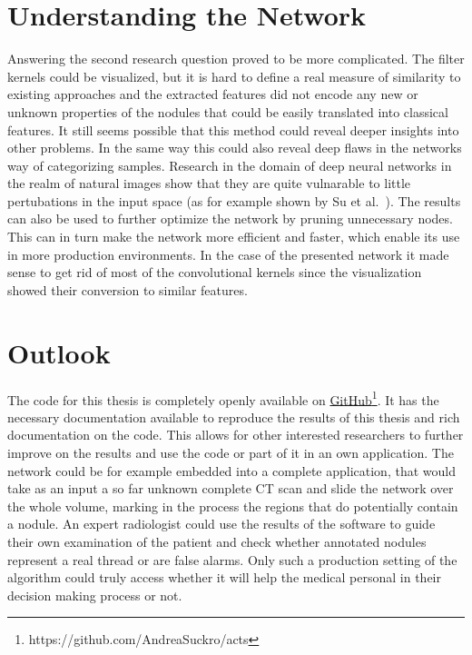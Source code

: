 \documentclass[main.tex]{subfiles}
\begin{document}
\section{Understanding the Network}
Answering the second research question proved to be more complicated. The filter kernels could be visualized, but it is hard to define a real measure of similarity to existing approaches and the extracted features did not encode any new or unknown properties of the nodules that could be easily translated into classical features. It still seems possible that this method could reveal deeper insights into other problems. In the same way this could also reveal deep flaws in the networks way of categorizing samples. Research in the domain of deep neural networks in the realm of natural images show that they are quite vulnarable to little pertubations in the input space (as for example shown by Su et al.~\cite{su2017one}). The results can also be used to further optimize the network by pruning unnecessary nodes. This can in turn make the network more efficient and faster, which enable its use in more production environments. In the case of the presented network it made sense to get rid of most of the convolutional kernels since the visualization showed their conversion to similar features.

\section{Outlook}
The code for this thesis is completely openly available on \href{https://github.com/AndreaSuckro/acts}{GitHub}\footnote{https://github.com/AndreaSuckro/acts}. It has the necessary documentation available to reproduce the results of this thesis and rich documentation on the code. This allows for other interested researchers to further improve on the results and use the code or part of it in an own application. The network could be for example embedded into a complete application, that would take as an input a so far unknown complete CT scan and slide the network over the whole volume, marking in the process the regions that do potentially contain a nodule. An expert radiologist could use the results of the software to guide their own examination of the patient and check whether annotated nodules represent a real thread or are false alarms. Only such a production setting of the algorithm could truly access whether it will help the medical personal in their decision making process or not.


\end{document}
